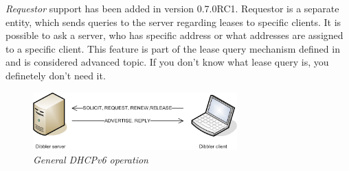 \emph{Requestor} support has been added in version 0.7.0RC1. Requestor
is a separate entity, which sends queries to the server regarding
leases to specific clients. It is possible to ask a server, who has
specific address or what addresses are assigned to a specific client.
This feature is part of the lease query mechanism defined in
\cite{rfc5007} and is considered advanced topic. If you don't know
what lease query is, you definetely don't need it.

\begin{figure}[ht]
\begin{center}
\includegraphics[width=0.7\textwidth]{dibbler-srv-cli}
\caption{\emph{General DHCPv6 operation}}
\end{center}
\end{figure}

